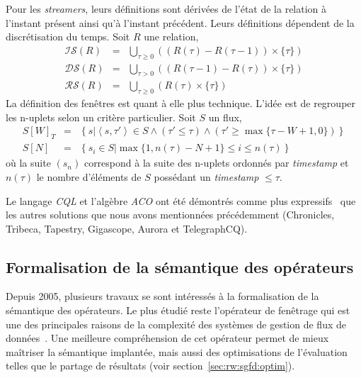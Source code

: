 Pour les \textit{streamers}, leurs définitions sont dérivées de l'état de la relation à l'instant présent ainsi qu'à l'instant précédent. Leurs définitions dépendent de la discrétisation du temps. Soit $R$ une relation,
\begin{eqnarray*}
    \mathcal{IS}(R) & = & \bigcup_{\tau\geq 0} ((R(\tau) - R(\tau-1))\times \{\tau\})\\
    \mathcal{DS}(R) & = & \bigcup_{\tau>0} ((R(\tau-1) - R(\tau))\times \{\tau\})\\
    \mathcal{RS}(R) & = & \bigcup_{\tau\geq 0} (R(\tau)\times \{\tau\})
\end{eqnarray*}
La définition des fenêtres est quant à elle plus technique. L'idée est de regrouper les n-uplets selon un critère particulier. Soit $S$ un flux,
\begin{eqnarray*}
    S[W]_T & = & \left\{s | \left<s,\tau'\right>\in S \wedge (\tau' \leq \tau) \wedge (\tau' \geq \max\{\tau - W +1,0\})   \right\}\\
    S[N] & = & \left\{s_i \in S | \max\{1,n(\tau)-N+1\} \leq i \leq n(\tau)\right\}
\end{eqnarray*}
où la suite $(s_n)$ correspond à la suite des n-uplets ordonnés par \textit{timestamp} et $n(\tau)$ le nombre d'éléments de $S$ possédant un \textit{timestamp} $\leq \tau$.

Le langage \textit{CQL} et l'algèbre \textit{ACO} ont été démontrés comme plus expressifs~\cite{Arasu:cql} que les autres solutions que nous avons mentionnées précédemment (Chronicles, Tribeca, Tapestry, Gigascope, Aurora et TelegraphCQ).

\subsection{Formalisation de la sémantique des opérateurs}\label{sec:rw:sgfd:modeles:batch}
Depuis 2005, plusieurs travaux se sont intéressés à la formalisation de la sémantique des opérateurs. Le plus étudié reste l'opérateur de fenêtrage qui est une des principales raisons de la complexité des systèmes de gestion de flux de données~\cite{Maier:semantics,Patroumpas:window,Patroumpas:subsumewindows}. Une meilleure compréhension de cet opérateur permet de mieux maîtriser la sémantique implantée, mais aussi des optimisations de l'évaluation telles que le partage de résultats (voir section~\ref{sec:rw:sgfd:optim}).

